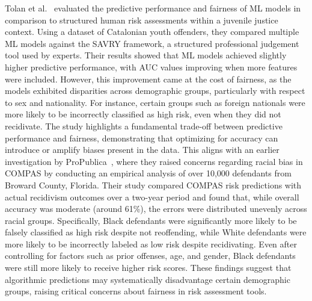 \documentclass[12pt]{article}
\begin{document}
Tolan et al.~\cite{tolan2019machine} evaluated the predictive performance and fairness of ML models in comparison to structured human risk assessments within a juvenile justice context. Using a dataset of Catalonian youth offenders, they compared multiple ML models against the SAVRY framework, a structured professional judgement tool used by experts. Their results showed that ML models achieved slightly higher predictive performance, with AUC values improving when more features were included. However, this improvement came at the cost of fairness, as the models exhibited disparities across demographic groups, particularly with respect to sex and nationality. For instance, certain groups such as foreign nationals were more likely to be incorrectly classified as high risk, even when they did not recidivate. The study highlights a fundamental trade-off between predictive performance and fairness, demonstrating that optimizing for accuracy can introduce or amplify biases present in the data. This aligns with an earlier investigation by ProPublica~\cite{propublica2016analysis}, where they raised concerns regarding racial bias in COMPAS by conducting an empirical analysis of over 10,000 defendants from Broward County, Florida. Their study compared COMPAS risk predictions with actual recidivism outcomes over a two-year period and found that, while overall accuracy was moderate (around 61\%), the errors were distributed unevenly across racial groups. Specifically, Black defendants were significantly more likely to be falsely classified as high risk despite not reoffending, while White defendants were more likely to be incorrectly labeled as low risk despite recidivating. Even after controlling for factors such as prior offenses, age, and gender, Black defendants were still more likely to receive higher risk scores. These findings suggest that algorithmic predictions may systematically disadvantage certain demographic groups, raising critical concerns about fairness in risk assessment tools.\\ 
\end{document}
